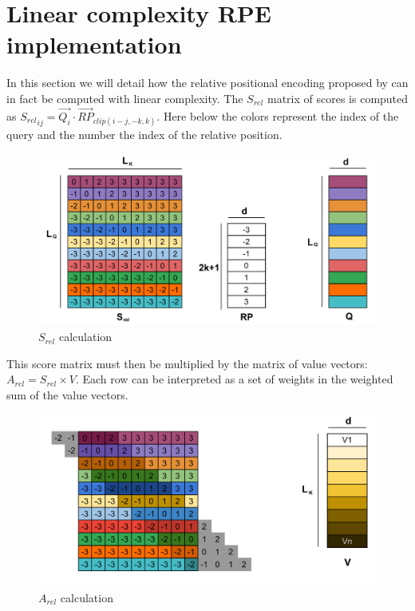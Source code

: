 \section{Linear complexity RPE
implementation}

In this section we will detail how the relative positional encoding
 proposed by \citet{shaw2018selfattention}
can in fact be computed with linear complexity. The \(S_{rel}\) matrix of scores is computed as
\({S_{rel}}_{ij} = \vec{Q_i} \cdotp \vec{RP}_{clip(i-j, -k, k)}\). Here
below the colors represent the index of the query and the number the
index of the relative position.

\begin{figure}
\centering
\includegraphics[width=0.9\linewidth]{images/S_rel.png}
\caption{$S_{rel}$ calculation}
\end{figure}

This score matrix must then be multiplied by the matrix of value
vectors: \(A_{rel} = S_{rel} \times V\). Each row can be interpreted as
a set of weights in the weighted sum of the value vectors.

\begin{figure}
\centering
\includegraphics[width=0.9\linewidth]{images/S_rel_V.png}
\caption{$A_{rel}$ calculation}
\end{figure}

